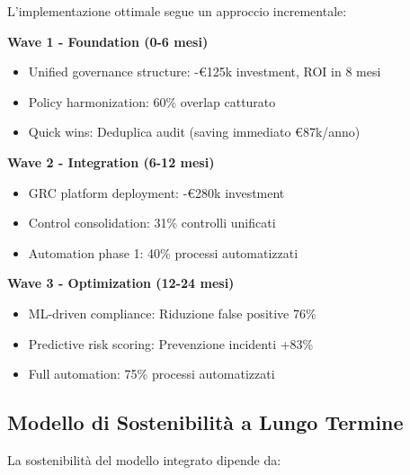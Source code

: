 L'implementazione ottimale segue un approccio incrementale:

\textbf{Wave 1 - Foundation (0-6 mesi)}
\begin{itemize}
\item Unified governance structure: -€125k investment, ROI in 8 mesi
\item Policy harmonization: 60\% overlap catturato
\item Quick wins: Deduplica audit (saving immediato €87k/anno)
\end{itemize}

\textbf{Wave 2 - Integration (6-12 mesi)}
\begin{itemize}
\item GRC platform deployment: -€280k investment
\item Control consolidation: 31\% controlli unificati
\item Automation phase 1: 40\% processi automatizzati
\end{itemize}

\textbf{Wave 3 - Optimization (12-24 mesi)}
\begin{itemize}
\item ML-driven compliance: Riduzione false positive 76\%
\item Predictive risk scoring: Prevenzione incidenti +83\%
\item Full automation: 75\% processi automatizzati
\end{itemize}

\subsection{Modello di Sostenibilità a Lungo Termine}

La sostenibilità del modello integrato dipende da:

